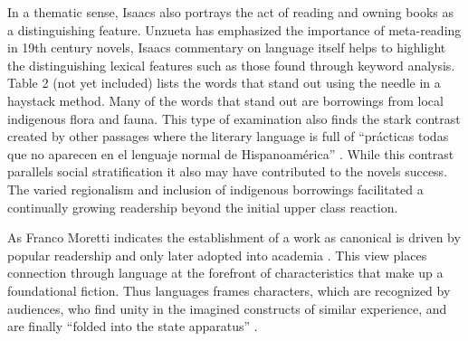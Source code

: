 In a thematic sense, Isaacs also portrays the act of reading and owning books as a distinguishing feature. 
Unzueta has emphasized the importance of meta-reading in 19th century novels, Isaacs commentary on language itself helps to highlight the distinguishing lexical features such as those found through keyword analysis.
Table 2 (not yet included) lists the words that stand out using the needle in a haystack method.
Many of the words that stand out are borrowings from local indigenous flora and fauna.
This type of examination also finds the stark contrast created by other passages where the literary language is full of \enquote{prácticas todas que no aparecen en el lenguaje normal de Hispanoamérica} \autocite[42]{McGrady2012}.
While this contrast parallels social stratification it also may have contributed to the novels success.
The varied regionalism and inclusion of indigenous borrowings facilitated a continually growing readership beyond the initial upper class reaction.

As Franco Moretti indicates the establishment of a work as canonical is driven by popular readership and only later adopted into academia \autocite[]{Moretti2013}.
This view places connection through language at the forefront of characteristics that make up a foundational fiction. 
Thus languages frames characters, which are recognized by audiences, who find unity in the imagined constructs of similar experience, and are finally \enquote{folded into the state apparatus} \autocite[27]{Felski2008}.

